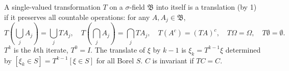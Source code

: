 A single-valued transformation $T$ on a $\sigma$-field $\mathfrak{B}$ into itself is a translation (by 1) if it preserves all countable operations: for any $A,A_j\in\mathfrak{B}$,
$$T(\bigcup_j A_j)=\bigcup_j TA_j,\quad T(\bigcap_j A_j)=\bigcap_j TA_j,\quad T(A^c)=(TA)^c,\quad T\Omega=\Omega,\quad T\emptyset=\emptyset.$$
$T^k$ is the $k$th iterate, $T^0=I$. The translate of $\xi$ by $k-1$ is $\xi_k=T^{k-1}\xi$ determined by $[\xi_k\in S]=T^{k-1}[\xi\in S]$ for all Borel $S$. $C$ is invariant if $TC=C$.
